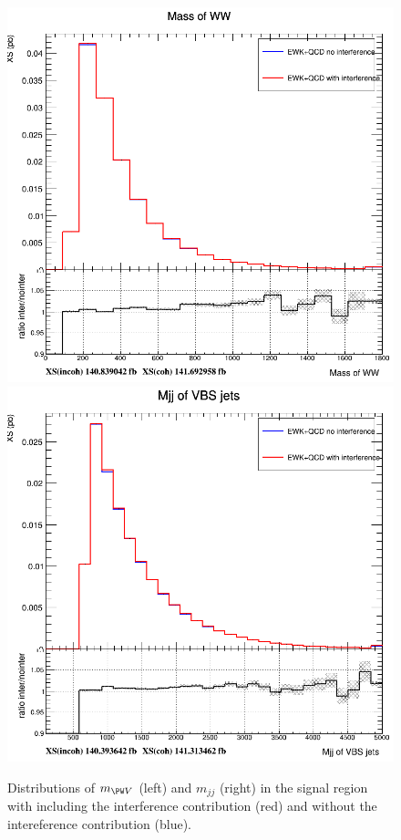 \begin{figure}[htb]
\centering
\includegraphics[width=\cmsFigWidth]{Plots/plots/interference_comparison_mww.png}
\includegraphics[width=\cmsFigWidth]{Plots/plots/interference_comparison_mjj_vbs.png}
\caption{Distributions of $m_{\PW V}$ (left) and $m_{jj}$ (right) in the signal region with including the interference contribution (red) and without the intereference contribution (blue).}
\label{fig:interference}
\end{figure}


